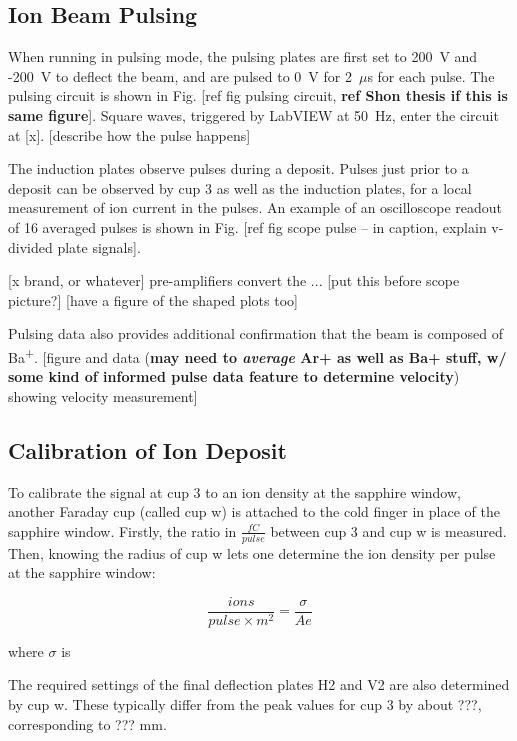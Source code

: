 \subsection{Ion Beam Pulsing}

When running in pulsing mode, the pulsing plates are first set to 200~V and -200~V to deflect the beam, and are pulsed to 0~V for {\color{red}2~$\mu$s} for each pulse.  The pulsing circuit is shown in Fig. [ref fig pulsing circuit, \textbf{ref Shon thesis if this is same figure}].  Square waves, triggered by LabVIEW at {\color{red}50~Hz}, enter the circuit at [x]. {\color{red}[describe how the pulse happens]}

The induction plates observe pulses during a deposit.  Pulses just prior to a deposit can be observed by cup 3 as well as the induction plates, for a local measurement of ion current in the pulses.  An example of an oscilloscope readout of {\color{red}16} averaged pulses is shown in Fig. [ref fig scope pulse -- in caption, explain v-divided plate signals].  

[x brand, or whatever] pre-amplifiers convert the ... [put this before scope picture?] [have a figure of the shaped plots too]

Pulsing data also provides additional confirmation that the beam is composed of Ba\textsuperscript{+}.  {\color{gray}[figure and data (\textbf{may need to \emph{average} Ar+ as well as Ba+ stuff, w/ some kind of informed pulse data feature to determine velocity}) showing velocity measurement]}

\subsection{Calibration of Ion Deposit}
\label{subsec:ionDepCal}

To calibrate the signal at cup 3 to an ion density at the sapphire window, another Faraday cup (called cup w) is attached to the cold finger in place of the sapphire window.  Firstly, the ratio in $\frac{fC}{pulse}$ between cup 3 and cup w is measured.  Then, knowing the radius of cup w lets one determine the ion density per pulse at the sapphire window:

\begin{equation}
\frac{ions}{pulse \times m^{2}} = \frac{\sigma}{A e}
\label{eqn:ion_density}
\end{equation}

\noindent
where $\sigma$ is 

The required settings of the final deflection plates H2 and V2 are also determined by cup w.  These typically differ from the peak values for cup 3 by about ???, corresponding to ??? mm.

